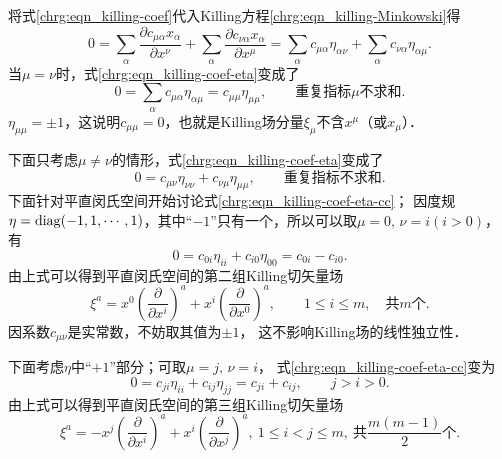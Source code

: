 将式\eqref{chrg:eqn_killing-coef}代入Killing方程\eqref{chrg:eqn_killing-Minkowski}得
\begin{equation}\label{chrg:eqn_killing-coef-eta}
    0=\sum_{\alpha}\frac{\partial c_{\mu \alpha}x_\alpha}{\partial x^\nu}
    +\sum_{\alpha} \frac{\partial c_{\nu \alpha}x_\alpha}{\partial x^\mu}
    =\sum_{\alpha} c_{\mu \alpha} \eta_{\alpha \nu}+\sum_{\alpha} c_{\nu \alpha} \eta_{\alpha \mu} .
\end{equation}
当$\mu=\nu$时，式\eqref{chrg:eqn_killing-coef-eta}变成了
\begin{equation}
    0=\sum_{\alpha} c_{\mu \alpha} \eta_{\alpha \mu} =c_{\mu \mu} \eta_{\mu \mu} ,
    \qquad \text{重复指标}\mu\text{不求和}.
\end{equation}
$\eta_{\mu \mu}=\pm 1$，这说明$c_{\mu \mu}=0$，也就是Killing场分量$\xi_\mu$不含$x^\mu$（或$x_\mu$）．

下面只考虑$\mu\neq\nu$的情形，式\eqref{chrg:eqn_killing-coef-eta}变成了
\begin{equation}\label{chrg:eqn_killing-coef-eta-cc}
    0=c_{\mu \nu} \eta_{\nu \nu}+c_{\nu \mu} \eta_{\mu \mu} , \qquad \text{重复指标不求和}.
\end{equation}
下面针对平直闵氏空间开始讨论式\eqref{chrg:eqn_killing-coef-eta-cc}；
因度规$\eta={\rm diag}(-1,1,\cdots,1)$，其中“$-1$”只有一个，所以可以取$\mu=0,\,\nu=i(i>0)$，有
\begin{equation}
    0=c_{0i} \eta_{ii}+c_{i 0} \eta_{00} =c_{0i} -c_{i 0} .
\end{equation}
由上式可以得到平直闵氏空间的第二组Killing切矢量场
\begin{equation}\label{chrg:eqn_Killing-Minkowski-2}
    \xi^a=x^0 \left(\frac{\partial}{\partial x^i}\right)^a
    +x^i \left(\frac{\partial}{\partial x^0}\right)^a, \qquad
    1\leqslant i \leqslant m,\quad \text{共$m$个}.
\end{equation}
因系数$c_{\mu\nu}$是实常数，不妨取其值为$\pm 1$，
这不影响Killing场的线性独立性．

下面考虑$\eta$中“$+1$”部分；可取$\mu=j,\,\nu=i$，
式\eqref{chrg:eqn_killing-coef-eta-cc}变为
\begin{equation}
    0=c_{ji} \eta_{ii}+c_{ij} \eta_{jj} =c_{ji} + c_{ij},  \qquad j>i>0.
\end{equation}
由上式可以得到平直闵氏空间的第三组Killing切矢量场
\begin{equation}\label{chrg:eqn_Killing-Minkowski-3}
    \xi^a= -x^j \left(\frac{\partial}{\partial x^i}\right)^a
    +x^i \left(\frac{\partial}{\partial x^j}\right)^a, \
    1\leqslant i < j \leqslant m,\ \text{共$\frac{m(m-1)}{2}$个}.
\end{equation}

